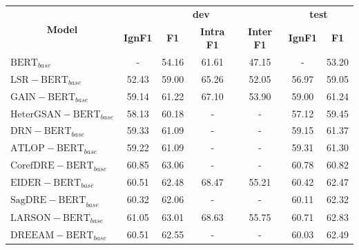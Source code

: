 \documentclass[bachelor]{thesis-uestc}
\begin{document}
\begin{table}
    \begin{tabular}{@{}llllcccccc@{}}
    \toprule
    \multicolumn{4}{c}{\multirow{2}{*}{\textbf{Model}}} & \multicolumn{4}{c}{\textbf{dev}}             & \multicolumn{2}{c}{\textbf{test}} \\ \cmidrule(l){5-10} 
    \multicolumn{4}{c}{}                       & \textbf{IgnF1} & \textbf{F1}    & \textbf{Intra F1} & \textbf{Inter F1} & \textbf{IgnF1}       & \textbf{F1}         \\ \midrule
    \multicolumn{4}{l}{$\mathrm{BERT}_{base}$\cite{DOCRED}}                   & -     & 54.16 & 61.61    & 47.15    & -           & 53.20      \\
    
    \multicolumn{4}{l}{$\mathrm{LSR-BERT}_{base}$\cite{nan-etal-2020-reasoning}}                   & 52.43 & 59.00 & 65.26   & 52.05   & 56.97       & 59.05   \\
    \multicolumn{4}{l}{$\mathrm{GAIN-BERT}_{base}$\cite{GAIN}}                   & 59.14 & 61.22 & 67.10    & 53.90    & 59.00       & 61.24      \\
    \multicolumn{4}{l}{$\mathrm{HeterGSAN-BERT}_{base}$\cite{Xu2020DocumentLevelRE}}                   & 58.13 & 60.18 & -   & -   & 57.12       & 59.45   \\
    \multicolumn{4}{l}{$\mathrm{DRN-BERT}_{base}$\cite{xu-etal-2021-discriminative}}                   & 59.33 & 61.09 & -   & -   & 59.15       & 61.37   \\
    \multicolumn{4}{l}{$\mathrm{ATLOP-BERT}_{base}$\cite{zhou2021document}}                  & 59.22 & 61.09 & -        & -        & 59.31       & 61.30      \\
    \multicolumn{4}{l}{$\mathrm{CorefDRE-BERT}_{base}$\cite{xue2022corefdre}}                  & 60.85 & 63.06 & -        & -        & 60.78       & 60.82      \\
    \multicolumn{4}{l}{$\mathrm{EIDER-BERT}_{base}$\cite{xie2022eider}}                  & 60.51 & 62.48 & 68.47    & 55.21    & 60.42       & 62.47      \\
    \multicolumn{4}{l}{$\mathrm{SagDRE-BERT}_{base}$\cite{SagDRE}}                 & 60.32 & 62.06 & -        & -        & 60.11       & 62.32      \\
    \multicolumn{4}{l}{$\mathrm{LARSON-BERT}_{base}$\cite{duan-etal-2022-just}}                 & 61.05 & 63.01 & 68.63        & 55.75        & 60.71       & 62.83      \\
    \multicolumn{4}{l}{$\mathrm{DREEAM-BERT}_{base}$\cite{ma-etal-2023-DREEAM}}                 & 60.51 & 62.55 & -        & -        & 60.03       & 62.49      \\

\end{tabular}
\end{table}
\end{document}
